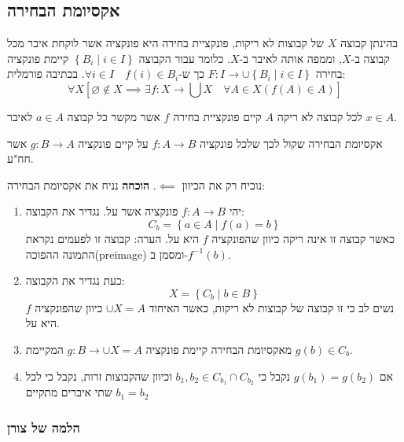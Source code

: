 \documentclass{tstextbook}
\begin{document}
\subsection{אקסיומת הבחירה}

\begin{definition}
בהינתן קבוצה \(X\) של קבוצות לא ריקות, פונקציית בחירה היא פונקציה אשר לוקחת איבר מכל קבוצה ב-\(X\), וממפה אותה לאיבר ב-\(X\). כלומר עבור הקבוצה \(\left\{  B_{i}\mid i \in I  \right\}\) קיימת פונקציה בחירה \(F:I\to \cup \left\{  B_{i}\mid i \in I  \right\}\) כך ש-\(\forall i \in I\quad f(i) \in B_{i}\). בכתיבה פורמלית:
$$\forall X\left[ \varnothing \not \in X\implies \exists f:X\to \bigcup X \quad \forall A \in X\left( f(A)\in A \right)  \right]$$

\end{definition}
\begin{definition}
לכל קבוצה לא ריקה \(A\) קיים פונקציית בחירה \(f\) אשר מקשר כל קבוצה \(a \in A\) לאיבר \(x \in A\). 

\end{definition}
\begin{proposition}
אקסיומת הבחירה שקול לכך שלכל פונקציה \(f:A\to B\) על קיים פונקציה \(g:B\to A\) אשר חח"ע.

\end{proposition}
נוכיח רק את הכיוון \(\impliedby\).
\textbf{הוכחה}
נניח את אקסיומת הבחירה:

\begin{enumerate}
  \item יהי \(f:A\to B\) פונקציה אשר על. נגדיר את הקבוצה: 
$$C_{b}=\left\{  a \in A\mid f(a)=b  \right\}$$
כאשר קבוצה זו אינה ריקה כיוון שהפונקציה \(f\) היא על. 
הערה: קבוצה זו לפעמים נקראת התמונה ההפוכה(preimage) ומסמן ב-\(f^{-1}(b)\).


  \item כעת נגדיר את הקבוצה: 
$$X=\left\{  C_{b}\mid b \in B  \right\}$$
נשים לב כי זו קבוצה של קבוצות לא ריקות, כאשר האיחוד \(\cup X=A\) כיוון שהפונקציה \(f\) היא על.


  \item מאקסיומת הבחירה קיימת פונקציה \(g:B\to \cup X=A\) המקיימת \(g(b)\in C_{b}\). 


  \item אם \(g(b_{1})=g(b_{2})\) נקבל כי \(b_{1},b_{2}\in C_{b_{1}}\cap C_{b_{2}}\) וכיוון שהקבוצות זרות, נקבל כי לכל שתי איברים מתקיים \(b_{1}=b_{2}\)


\end{enumerate}
\subsubsection{הלמה של צורן}
\end{document}
